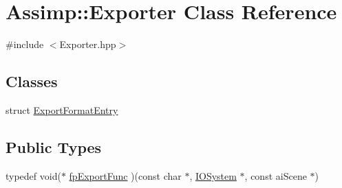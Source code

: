 \hypertarget{class_assimp_1_1_exporter}{\section{Assimp\-:\-:Exporter Class Reference}
\label{class_assimp_1_1_exporter}
}


{\ttfamily \#include $<$Exporter.\-hpp$>$}

\subsection*{Classes}
\begin{DoxyCompactItemize}
\item 
struct \hyperlink{struct_assimp_1_1_exporter_1_1_export_format_entry}{Export\-Format\-Entry}
\end{DoxyCompactItemize}
\subsection*{Public Types}
\begin{DoxyCompactItemize}
\item 
typedef void($\ast$ \hyperlink{class_assimp_1_1_exporter_aa67334a75cb24e030af984d01e622f3b}{fp\-Export\-Func} )(const char $\ast$, \hyperlink{class_assimp_1_1_i_o_system}{I\-O\-System} $\ast$, const ai\-Scene $\ast$)
\end{DoxyCompactItemize}
